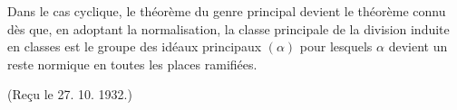 Dans le cas cyclique, le théorème du genre principal devient le théorème connu dès que, en adoptant la normalisation, la classe principale de la division induite en classes est le groupe des idéaux principaux \((\alpha)\) pour lesquels \(\alpha\) devient un reste normique en toutes les places ramifiées.

\begin{center}
(Reçu le 27. 10. 1932.)
\end{center}

\clearpage

\setcounter{footnote}{0}
